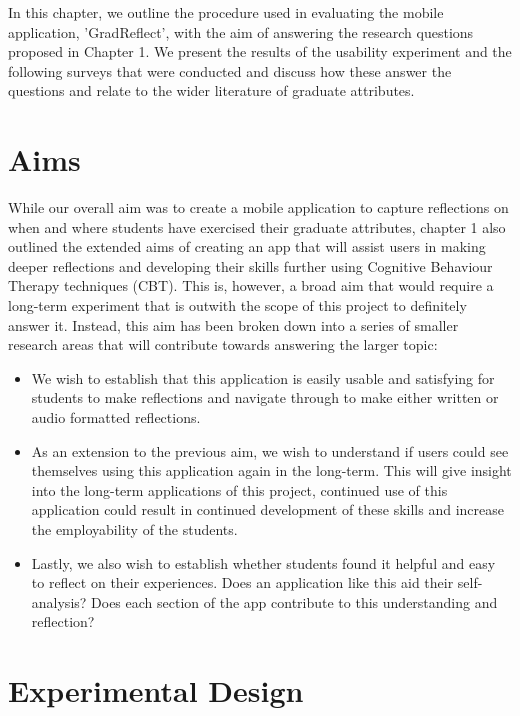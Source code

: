 \documentclass{l4proj}
\begin{document}
In this chapter, we outline the procedure used in evaluating the mobile application, 'GradReflect', 
with the aim of answering the research questions proposed in Chapter 1. We present the results of the 
usability experiment and the following surveys that were conducted and discuss how these 
answer the questions and relate to the wider literature of graduate attributes.

\section{Aims}

While our overall aim was to create a mobile application to capture reflections on when and where
students have exercised their graduate attributes, chapter 1 also outlined the extended aims of creating
an app that will assist users in making deeper reflections and developing their skills further using 
Cognitive Behaviour Therapy techniques (CBT). This is, however, a broad aim that would require a long-term 
experiment that is outwith the scope of this project to definitely answer it. Instead, this aim has been 
broken down into a series of smaller research areas that will contribute towards answering the larger topic:

\begin{itemize}
    \item We wish to establish that this application is easily usable and satisfying 
    for students to make reflections and navigate through to make either written or 
    audio formatted reflections. 
    \item As an extension to the previous aim, we wish to understand if users could see themselves using this 
    application again in the long-term. This will give insight into the long-term applications of this project, 
    continued use of this application could result in continued development of these skills and increase the employability
    of the students.
    \item Lastly, we also wish to establish whether students found it helpful and easy to reflect on their
    experiences. Does an application like this aid their self-analysis? Does each section of the app 
    contribute to this understanding and reflection?
\end{itemize}

\section{Experimental Design}
\end{document}
